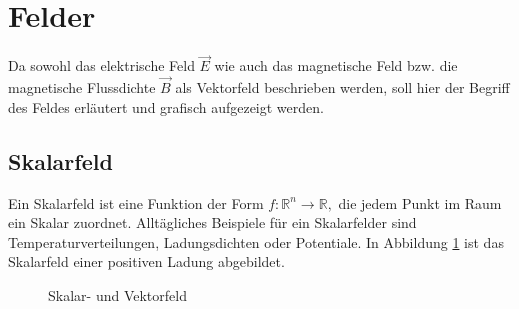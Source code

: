 %
%
% 
%
%
\section{Felder\label{maxwell:mathFormulierung}}

Da sowohl das elektrische Feld $\vec{E}$ wie auch das magnetische Feld bzw. die magnetische Flussdichte $\vec{B}$ als Vektorfeld beschrieben werden, soll hier der Begriff des Feldes erläutert und grafisch aufgezeigt werden.

\subsection{Skalarfeld\label{maxwell:skalarfeld}}

Ein Skalarfeld ist eine Funktion der Form
\( f:\mathbb{R}^n \rightarrow \mathbb{R}, \) 
die jedem Punkt im Raum ein Skalar zuordnet.
Alltägliches Beispiele für ein Skalarfelder sind Temperaturverteilungen, Ladungsdichten oder Potentiale. In Abbildung \ref{maxwell:skalarGrad} ist das Skalarfeld einer positiven Ladung abgebildet.



\begin{figure}
	\centering
	\caption{Skalar- und Vektorfeld}
	\label{maxwell:skalarGrad}
\end{figure}

